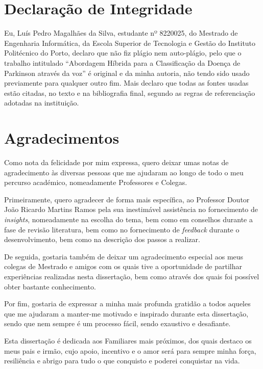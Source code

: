 \documentclass[12pt,a4paper,twoside]{report}
\begin{document}


\chapter*{Declaração de Integridade}

Eu, Luís Pedro Magalhães da Silva, estudante nº 8220025, do Mestrado de Engenharia Informática, da Escola Superior de Tecnologia e Gestão do Instituto Politécnico do Porto, declaro que não fiz plágio nem auto-plágio, pelo que o trabalho intitulado “Abordagem Híbrida para a Classificação da Doença de Parkinson através da voz” é original e da minha autoria, não tendo sido usado previamente para qualquer outro fim. Mais declaro que todas as fontes usadas estão citadas, no texto e na bibliografia final, segundo as regras de referenciação adotadas na instituição.

\chapter*{Agradecimentos}
Como nota da felicidade por mim expressa, quero deixar umas notas de agradecimento às diversas pessoas que me ajudaram ao longo de todo o meu percurso académico, nomeadamente Professores e Colegas.

Primeiramente, quero agradecer de forma mais específica, ao Professor Doutor João Ricardo Martins Ramos pela sua inestimável assistência no fornecimento de \textit{insights}, nomeadamente na escolha do tema, bem como em conselhos durante a fase de revisão literatura, bem como no fornecimento de \textit{feedback} durante o desenvolvimento, bem como na descrição dos passos a realizar.

De seguida, gostaria também de deixar um agradecimento especial aos meus colegas de Mestrado e amigos com os quais tive a oportunidade de partilhar experiências realizadas nesta dissertação, bem como através dos quais foi possível obter bastante conhecimento.

Por fim, gostaria de expressar a minha mais profunda gratidão a todos aqueles que me ajudaram a manter-me motivado e inspirado durante esta dissertação, sendo que nem sempre é um processo fácil, sendo exaustivo e desafiante.

Esta dissertação é dedicada aos Familiares mais próximos, dos quais destaco os meus pais e irmão, cujo apoio, incentivo e
o amor será para sempre minha força, resiliência e abrigo para tudo o que conquisto e poderei conquistar na vida.
\end{document}
